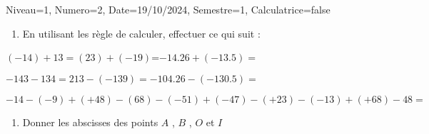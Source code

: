 \documentclass[a4paper,12pt]{article}
\begin{document}
\begin{Maquette}[DS]{Niveau=1, Numero=2, Date=19/10/2024, Semestre=1, Calculatrice=false}
\begin{exercice}
\end{exercice}

\begin{exercice}
\begin{enumerate}
\item{} En utilisant les règle de calculer, effectuer ce qui suit : 
\end{enumerate}
\begin{multicols}{2}
$(-14)+13=$\anserline[2] 
$(23)+(-19)$=\anserline[2]
$-14.26+(-13.5)=$\anserline[2]
\columnbreak

$-143-134=$\anserline[2]
$213-(-139)=$\anserline[2]  
$-104.26-(-130.5)=$\anserline[2] 
\end{multicols}
$-14-(-9)+(+48)-(68)-(-51)+(-47)-(+23)-(-13)+(+68)-48=$\anserline[1]
\anserline[1]

\end{exercice}

\begin{exercice}
\begin{enumerate}
\item{} Donner les abscisses des points $A$ , $B$ , $O$ et $I$ 
\end{enumerate}
\end{exercice}


\end{Maquette}
\end{document}

